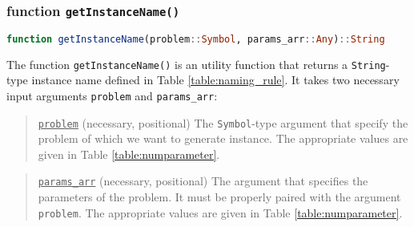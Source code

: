 \subsubsection{function \texttt{getInstanceName()}}
\begin{lstlisting}[frame=single,language=julia]
function getInstanceName(problem::Symbol, params_arr::Any)::String
\end{lstlisting}		
The function \texttt{getInstanceName()} is an utility function that returns a \texttt{String}-type instance name defined in Table \ref{table:naming_rule}. It takes two necessary input arguments \texttt{problem} and \texttt{params\_arr}:
\begin{quote}
	\noindent\underline{\texttt{problem}} (necessary, positional) The \texttt{Symbol}-type argument that specify the problem of which we want to generate instance. The appropriate values are given in Table \ref{table:numparameter}. 
\end{quote}

\begin{quote}
	\noindent\underline{\texttt{params\_arr}} (necessary, positional) The argument that specifies the parameters of the problem. It must be properly paired with the argument \texttt{problem}. The appropriate values are given in Table \ref{table:numparameter}. 
\end{quote}

